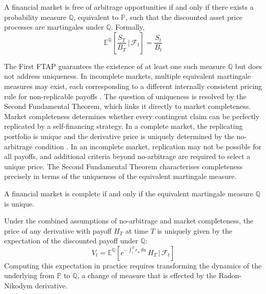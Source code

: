     \begin{theorem}\label{thm:FTAP}
        A financial market is free of arbitrage opportunities if and only if there exists a probability measure $\mathbb{Q}$, equivalent to $\mathbb{P}$, such that the discounted asset price processes are martingales under $\mathbb{Q}$. Formally,
        \begin{equation}
            \mathbb{E}^\mathbb{Q}\!\left[ \frac{S_T}{B_T} \,\Bigg|\, \mathcal{F}_t \right] = \frac{S_t}{B_t}
        \end{equation}
    \end{theorem}

    \noindent
    The First FTAP guarantees the existence of at least one such measure $\mathbb{Q}$ but does not address uniqueness. In incomplete markets, multiple equivalent martingale measures may exist, each corresponding to a different internally consistent pricing rule for non-replicable payoffs \cite{shreve2004stochastic}. The question of uniqueness is resolved by the Second Fundamental Theorem, which links it directly to market completeness.\\

    \noindent
    Market completeness determines whether every contingent claim can be perfectly replicated by a self-financing strategy. In a complete market, the replicating portfolio is unique and the derivative price is uniquely determined by the no-arbitrage condition \cite{brigo2001interest}. In an incomplete market, replication may not be possible for all payoffs, and additional criteria beyond no-arbitrage are required to select a unique price. The Second Fundamental Theorem characterises completeness precisely in terms of the uniqueness of the equivalent martingale measure.

    \begin{theorem}\label{thm:SFTAP}
        A financial market is complete if and only if the equivalent martingale measure $\mathbb{Q}$ is unique.
    \end{theorem}

    \noindent
    Under the combined assumptions of no-arbitrage and market completeness, the price of any derivative with payoff $H_T$ at time $T$ is uniquely given by the expectation of the discounted payoff under $\mathbb{Q}$:
    \begin{equation}
        V_t = \mathbb{E}^{\mathbb{Q}}\!\left[ e^{-\int_t^T r_u\,du}\, H_T \,\Big|\, \mathcal{F}_t \right]
    \end{equation}
    Computing this expectation in practice requires transforming the dynamics of the underlying from $\mathbb{P}$ to $\mathbb{Q}$, a change of measure that is effected by the Radon-Nikodym derivative. \\

